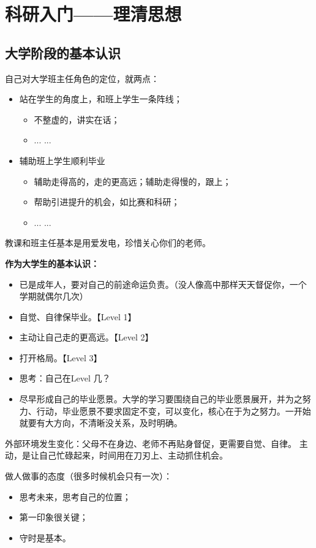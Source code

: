 \chapter{科研入门——理清思想}
\section{大学阶段的基本认识}
自己对大学班主任角色的定位，就两点：
\begin{itemize}
\item 站在学生的角度上，和班上学生一条阵线；
\begin{itemize}
\item 不整虚的，讲实在话；
\item ... ...
\end{itemize}
\item 辅助班上学生顺利毕业
\begin{itemize}
\item 辅助走得高的，走的更高远；辅助走得慢的，跟上；
\item 帮助引进提升的机会，如比赛和科研；
\item ... ...
\end{itemize}
\end{itemize}
教课和班主任基本是用爱发电，珍惜关心你们的老师。


{\bf 作为大学生的基本认识：}
\begin{itemize}
\item 已是成年人，要对自己的前途命运负责。（没人像高中那样天天督促你，一个学期就偶尔几次）

\item 自觉、自律保毕业。【Level 1】

\item 主动让自己走的更高远。【Level 2】

\item 打开格局。【Level 3】

\item 思考：自己在Level 几？

\item 尽早形成自己的毕业愿景。大学的学习要围绕自己的毕业愿景展开，并为之努力、行动，毕业愿景不要求固定不变，可以变化，核心在于为之努力。一开始就要有大方向，不清晰没关系，及时明确。
\end{itemize}

外部环境发生变化：父母不在身边、老师不再贴身督促，更需要自觉、自律。
主动，是让自己忙碌起来，时间用在刀刃上、主动抓住机会。

做人做事的态度（很多时候机会只有一次）：
\begin{itemize}
\item 思考未来，思考自己的位置；
\item 第一印象很关键；
\item 守时是基本。
\end{itemize}




